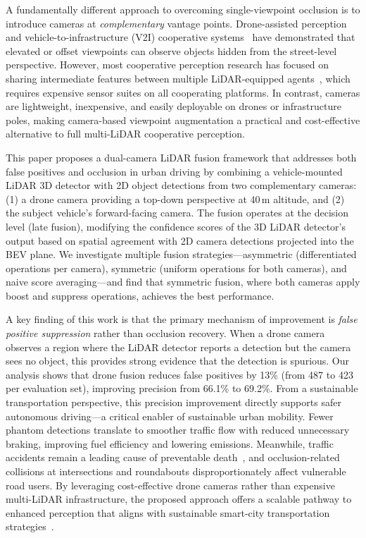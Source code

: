 \documentclass[sustainability,article,submit,moreauthors,pdftex]{Definitions/mdpi}
\begin{document}
A fundamentally different approach to overcoming single-viewpoint occlusion is to introduce cameras at \emph{complementary} vantage points. Drone-assisted perception~\cite{liu2022drone,shi2024dronecoop} and vehicle-to-infrastructure (V2I) cooperative systems~\cite{arnold2020cooperative,yu2022dairv2x} have demonstrated that elevated or offset viewpoints can observe objects hidden from the street-level perspective. However, most cooperative perception research has focused on sharing intermediate features between multiple LiDAR-equipped agents~\cite{xu2022opv2v,xu2022v2xvit,xu2023cobevt}, which requires expensive sensor suites on all cooperating platforms. In contrast, cameras are lightweight, inexpensive, and easily deployable on drones or infrastructure poles, making camera-based viewpoint augmentation a practical and cost-effective alternative to full multi-LiDAR cooperative perception.

This paper proposes a dual-camera LiDAR fusion framework that addresses both false positives and occlusion in urban driving by combining a vehicle-mounted LiDAR 3D detector with 2D object detections from two complementary cameras: (1) a drone camera providing a top-down perspective at 40\,m altitude, and (2) the subject vehicle's forward-facing camera. The fusion operates at the decision level (late fusion), modifying the confidence scores of the 3D LiDAR detector's output based on spatial agreement with 2D camera detections projected into the BEV plane. We investigate multiple fusion strategies---asymmetric (differentiated operations per camera), symmetric (uniform operations for both cameras), and naive score averaging---and find that symmetric fusion, where both cameras apply boost and suppress operations, achieves the best performance.

A key finding of this work is that the primary mechanism of improvement is \emph{false positive suppression} rather than occlusion recovery. When a drone camera observes a region where the LiDAR detector reports a detection but the camera sees no object, this provides strong evidence that the detection is spurious. Our analysis shows that drone fusion reduces false positives by 13\% (from 487 to 423 per evaluation set), improving precision from 66.1\% to 69.2\%. From a sustainable transportation perspective, this precision improvement directly supports safer autonomous driving---a critical enabler of sustainable urban mobility. Fewer phantom detections translate to smoother traffic flow with reduced unnecessary braking, improving fuel efficiency and lowering emissions. Meanwhile, traffic accidents remain a leading cause of preventable death~\cite{choi2010crash}, and occlusion-related collisions at intersections and roundabouts disproportionately affect vulnerable road users. By leveraging cost-effective drone cameras rather than expensive multi-LiDAR infrastructure, the proposed approach offers a scalable pathway to enhanced perception that aligns with sustainable smart-city transportation strategies~\cite{yurtsever2020survey}.
\end{document}
